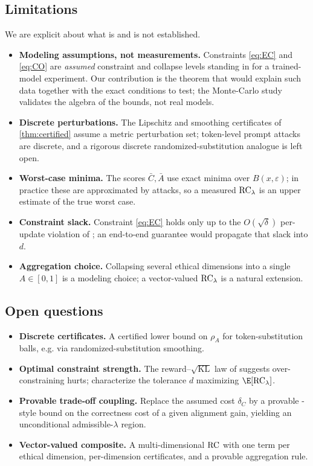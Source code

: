 \subsection{Limitations}
We are explicit about what is and is not established.
\begin{itemize}[leftmargin=*,itemsep=2pt,topsep=2pt]
  \item \textbf{Modeling assumptions, not measurements.} Constraints \eqref{eq:EC}
  and \eqref{eq:CO} are \emph{assumed} constraint and collapse levels standing in
  for a trained-model experiment. Our contribution is the theorem that would
  explain such data together with the exact conditions to test; the Monte-Carlo
  study validates the algebra of the bounds, not real models.
  \item \textbf{Discrete perturbations.} The Lipschitz and smoothing certificates of
  \cref{thm:certified} assume a metric perturbation set; token-level prompt attacks
  \cite{Zou2023} are discrete, and a rigorous discrete
  randomized-substitution analogue is left open.
  \item \textbf{Worst-case minima.} The scores $\bar C,\bar A$ use exact minima over
  $B(x,\varepsilon)$; in practice these are approximated by attacks, so a measured
  $\mathrm{RC}_\lambda$ is an upper estimate of the true worst case.
  \item \textbf{Constraint slack.} Constraint \eqref{eq:EC} holds only up to the
  $O(\sqrt\delta)$ per-update violation of \cite{Achiam2017}; an end-to-end
  guarantee would propagate that slack into $d$.
  \item \textbf{Aggregation choice.} Collapsing several ethical dimensions into a
  single $A\in[0,1]$ is a modeling choice; a vector-valued $\mathrm{RC}_\lambda$ is a
  natural extension.
\end{itemize}

\subsection{Open questions}
\begin{itemize}[leftmargin=*,itemsep=2pt,topsep=2pt]
  \item \textbf{Discrete certificates.} A certified lower bound on $\rho_A$ for
  token-substitution balls, e.g. via randomized-substitution smoothing.
  \item \textbf{Optimal constraint strength.} The reward--$\sqrt{\mathrm{KL}}$ law
  of \cite{Bai2022b} suggests over-constraining hurts; characterize the tolerance
  $d$ maximizing $\E[\RC_\lambda]$.
  \item \textbf{Provable trade-off coupling.} Replace the assumed cost $\delta_C$ by
  a provable \cite{Tsipras2018}-style bound on the correctness cost of a given
  alignment gain, yielding an unconditional admissible-$\lambda$ region.
  \item \textbf{Vector-valued composite.} A multi-dimensional $\mathrm{RC}$ with one term
  per ethical dimension, per-dimension certificates, and a provable aggregation
  rule.
\end{itemize}

